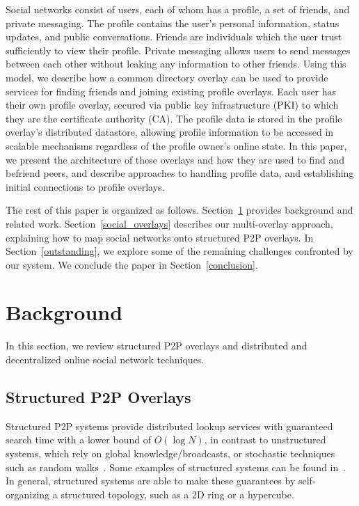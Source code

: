 \documentclass[letterpaper,twocolumn,10pt]{article}
\begin{document}
Social networks consist of users, each of whom has a profile, a set
of friends, and private messaging.  The profile contains the user's
personal information, status updates, and public conversations.  Friends are
individuals which the user trust sufficiently to view their profile.  Private
messaging allows users to send messages between each other without leaking any
information to other friends.  Using this model, we describe how a common
directory overlay can be used to provide services for finding friends and
joining existing profile overlays.  Each user has their own profile overlay,
secured via public key infrastructure (PKI) to which they are the certificate
authority (CA).  The profile data is stored in the profile overlay's distributed
datastore, allowing profile information to be accessed in scalable mechanisms
regardless of the profile owner's online state.  In this paper, we present
the architecture of these overlays and how they are used to find and befriend
peers, and describe approaches to handling profile data, and establishing
initial connections to profile overlays.

The rest of this paper is organized as follows.  Section~\ref{background}
provides background and related work.  Section~\ref{social_overlays} describes
our multi-overlay approach, explaining how to map social networks onto structured
P2P overlays.  In Section~\ref{outstanding}, we explore some of the remaining
challenges confronted by our system.  We conclude the paper in
Section~\ref{conclusion}.

\section{Background}
\label{background}
In this section, we review structured P2P overlays and distributed and
decentralized online social network techniques.
\subsection{Structured P2P Overlays}
Structured P2P systems provide distributed lookup services with guaranteed
search time with a lower bound of $O(\log N)$, in contrast to unstructured
systems, which rely on global knowledge/broadcasts, or stochastic techniques
such as random walks~\cite{unstructured_v_structured}.  Some examples of
structured systems can be found in~\cite{pastry, chord, symphony, kademlia,
can}.  In general, structured systems are able to make these guarantees by
self-organizing a structured topology, such as a 2D ring or a hypercube.
\end{document}
